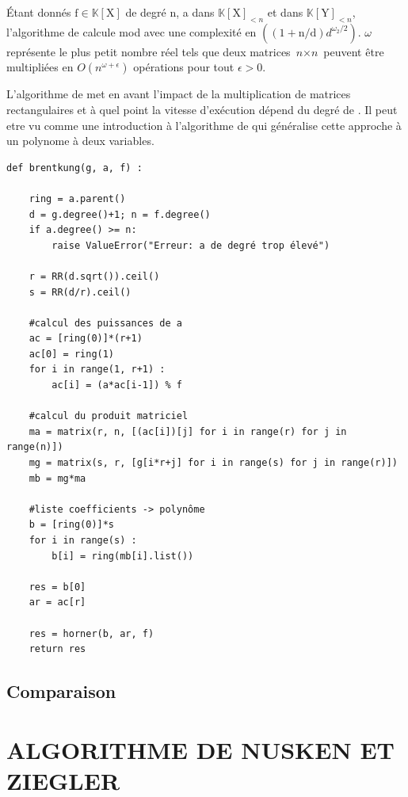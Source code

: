 \documentclass[a4paper]{article}
\begin{document}
Étant donnés $\text{f}\in\mathbb{K}[\mathrm{X}]$ de degré n, a dans $\mathbb{K}[\mathrm{X}]_{<n}$ et  dans $\mathbb{K}[\mathrm{Y}]_{<n}$, l'algorithme de  calcule   mod  avec une complexité en $((1+\text{n/d})d^{\omega_{2}/2})$. $\omega$ représente le plus petit nombre réel tels que deux matrices $\textit{n}\times\textit{n}$ peuvent être multipliées en $O(\textit{n}^{\omega+\epsilon})$ opérations pour tout $\epsilon>0$. 

L'algorithme de  met en avant l'impact de la multiplication de matrices rectangulaires et à quel point la vitesse d'exécution dépend du degré de . Il peut etre vu comme une introduction à  l'algorithme de  qui généralise cette approche à un polynome  à deux variables.

\begin{lstlisting}[title={brent and kung}]
def brentkung(g, a, f) :

	ring = a.parent()
	d = g.degree()+1; n = f.degree()
	if a.degree() >= n:
		raise ValueError("Erreur: a de degré trop élevé")

	r = RR(d.sqrt()).ceil()
	s = RR(d/r).ceil()

    #calcul des puissances de a
	ac = [ring(0)]*(r+1)
	ac[0] = ring(1)
	for i in range(1, r+1) :
		ac[i] = (a*ac[i-1]) % f

    #calcul du produit matriciel
	ma = matrix(r, n, [(ac[i])[j] for i in range(r) for j in range(n)])
	mg = matrix(s, r, [g[i*r+j] for i in range(s) for j in range(r)])
	mb = mg*ma

    #liste coefficients -> polynôme
	b = [ring(0)]*s
	for i in range(s) :
		b[i] = ring(mb[i].list())

	res = b[0]
	ar = ac[r]

	res = horner(b, ar, f)
	return res
\end{lstlisting}

\subsection{Comparaison}


\section{ALGORITHME DE NUSKEN ET ZIEGLER}
\end{document}
